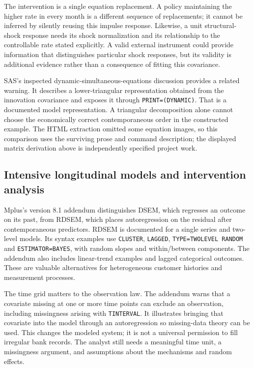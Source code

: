 The intervention is a single equation replacement. A policy maintaining
the higher rate in every month is a different sequence of replacements;
it cannot be inferred by silently reusing this impulse response.
Likewise, a unit structural-shock response needs its shock normalization
and its relationship to the controllable rate stated explicitly. A valid
external instrument could provide information that distinguishes
particular shock responses, but its validity is additional evidence
rather than a consequence of fitting this covariance.

SAS's inspected dynamic-simultaneous-equations discussion provides a
related warning. It describes a lower-triangular representation obtained
from the innovation covariance and exposes it through
\texttt{PRINT=(DYNAMIC)}. That is a documented model representation. A
triangular decomposition alone cannot choose the economically correct
contemporaneous order in the constructed example. The HTML extraction
omitted some equation images, so this comparison uses the surviving
prose and command description; the displayed matrix derivation above is
independently specified project work.
\citep{exec13_ct_sas_structural,exec13_ct_examples}

\hypertarget{intensive-longitudinal-models-and-intervention-analysis}{%
\subsection{Intensive longitudinal models and intervention
analysis}\label{intensive-longitudinal-models-and-intervention-analysis}}

Mplus's version 8.1 addendum distinguishes DSEM, which regresses an
outcome on its past, from RDSEM, which places autoregression on the
residual after contemporaneous predictors. RDSEM is documented for a
single series and two-level models. Its syntax examples use
\texttt{CLUSTER}, \texttt{LAGGED}, \texttt{TYPE=TWOLEVEL\ RANDOM} and
\texttt{ESTIMATOR=BAYES}, with random slopes and within/between
components. The addendum also includes linear-trend examples and lagged
categorical outcomes. These are valuable alternatives for heterogeneous
customer histories and measurement processes. \citep{exec13_ct_mplus81}

The time grid matters to the observation law. The addendum warns that a
covariate missing at one or more time points can exclude an observation,
including missingness arising with \texttt{TINTERVAL}. It illustrates
bringing that covariate into the model through an autoregression so
missing-data theory can be used. This changes the modeled system; it is
not a universal permission to fill irregular bank records. The analyst
still needs a meaningful time unit, a missingness argument, and
assumptions about the mechanisms and random effects.


